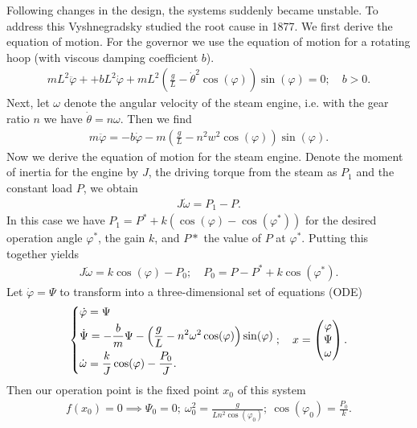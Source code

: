 \begin{ex}
Following changes in the design, the systems suddenly became unstable. To address this Vyshnegradsky studied the root cause in 1877. We first derive the equation of motion. For the governor we use the equation of motion for a rotating hoop (with viscous damping coefficient $b$).
\begin{align}
	mL^2 \ddot{\varphi} + +bL^2 \dot{\varphi} +mL^2\left( \frac{g}{L} - \dot{\theta}^2 \cos(\varphi) \right) \sin(\varphi) = 0;\quad b>0.
\end{align}
Next, let $\omega $ denote the angular velocity of the steam engine, i.e. with the gear ratio $n$ we have $\dot{\theta} = n \omega$. Then we find
\begin{align}
	m \ddot{\varphi} = -b \dot{\varphi} - m \left( \frac{g}{L} - n^2 w^2 \cos(\varphi) \right) \sin(\varphi).
\end{align}
Now we derive the equation of motion for the steam engine. Denote the moment of inertia for the engine by $J$, the driving torque from the steam as $P_1$ and the constant load $P$, we obtain
\begin{align}
	J \dot{\omega } = P_1 - P.
\end{align}
In this case we have $P_1 = P^{*} + k\left( \cos(\varphi) - \cos(\varphi^{*}) \right)$ for the desired operation angle $\varphi^{*}$, the gain $k$, and $P*$ the value of $P$ at $\varphi^{*}$. Putting this together yields
\begin{align}
	J \dot{\omega } = k \cos(\varphi) - P_0;\quad P_0 = P - P^{*} + k \cos(\varphi^{*}).
\end{align}
Let $\dot{\varphi} = \Psi$ to transform into a three-dimensional set of equations (ODE)
\begin{align}
	\begin{dcases}
		\dot{\varphi} = \Psi \\
		\dot{\Psi} = -\frac{b}{m} \Psi - \left( \frac{g}{L} - n^2 \omega^2 \cos(\varphi) \right) \sin (\varphi) \\
		\dot{\omega } = \frac{k}{J}\cos(\varphi) - \frac{P_0}{J}.
	\end{dcases};
	\quad x =
	\begin{pmatrix}
		\varphi \\ \Psi \\ \omega 
	\end{pmatrix}
	.
\end{align}
Then our operation point is the fixed point $x_0$ of this system
\begin{align}
	f(x_0) = 0 \implies \Psi_0 = 0;\ \omega_0^2 = \frac{g}{Ln^2 \cos(\varphi_0)};\ \cos(\varphi_0) = \frac{P_0}{k}.

\end{align}
\end{ex}
